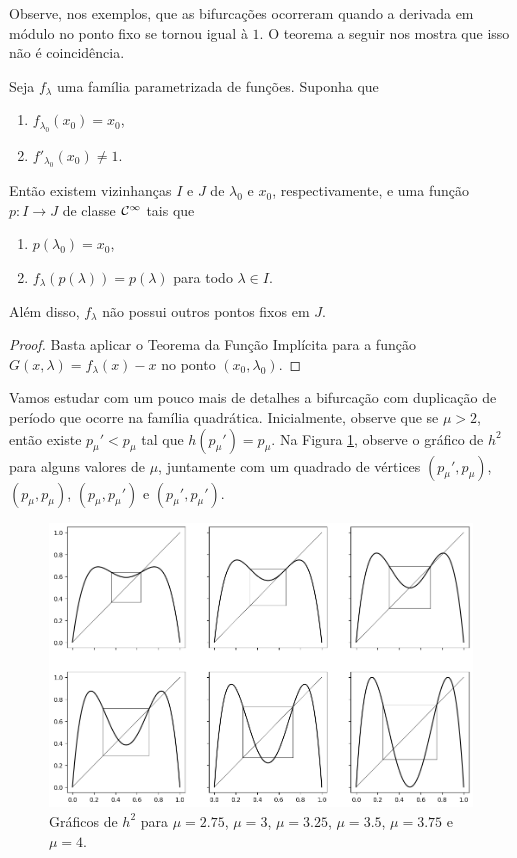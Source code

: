 Observe, nos exemplos, que as bifurcações ocorreram quando a derivada em módulo no ponto fixo se tornou igual à $1$. O teorema a seguir nos mostra que isso não é coincidência.

\begin{theorem}
\label{theorem1}
Seja $f_\lambda$ uma família parametrizada de funções.
Suponha que
\begin{enumerate}
\item $f_{\lambda_0}(x_0) = x_0$,
\item $f'_{\lambda_0}(x_0) \neq 1$. 
\end{enumerate}
Então existem vizinhanças $I$ e $J$ de $\lambda_0$ e $x_0$, respectivamente, e uma função $p: I \to J$ de classe $\mathcal{C}^\infty$ tais que
\begin{enumerate}
\item $p(\lambda_0) = x_0$, 
\item $f_\lambda(p(\lambda)) = p(\lambda)$ para todo $\lambda \in I$.
\end{enumerate}
Além disso, $f_\lambda$ não possui outros pontos fixos em $J$.
\end{theorem}

\begin{proof}
Basta aplicar o Teorema da Função Implícita para a função $G(x, \lambda) = f_\lambda(x) - x$ no ponto $(x_0, \lambda_0)$.
\end{proof}

Vamos estudar com um pouco mais de detalhes a bifurcação com duplicação de período que ocorre na família quadrática.
Inicialmente, observe que se $\mu > 2$, então existe $p_\mu' < p_\mu$ tal que $h(p_\mu') = p_\mu$.
Na Figura \ref{h^2-and-boxes}, observe o gráfico de $h^2$ para alguns valores de $\mu$, juntamente com um quadrado de vértices $(p_\mu', p_\mu)$, $(p_\mu, p_\mu)$, $(p_\mu, p_\mu')$ e $(p_\mu', p_\mu')$.

\begin{figure}[!htb]
\centering
\includegraphics[scale=0.6]{images/h^2withboxes.png}
\caption{Gráficos de $h^2$ para $\mu = 2.75$, $\mu = 3$, $\mu = 3.25$, $\mu = 3.5$, $\mu = 3.75$ e $\mu = 4$.}
\label{h^2-and-boxes}
\end{figure}

